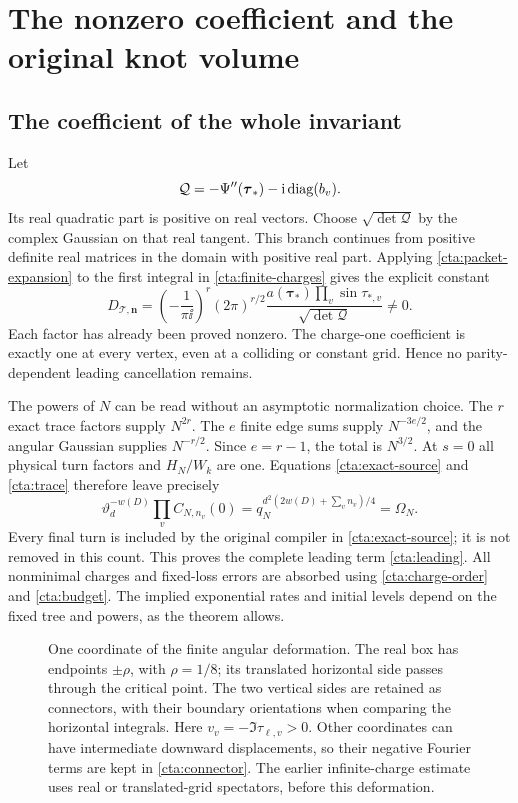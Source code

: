 \section{The nonzero coefficient and the original knot volume}
\label{cta:conclusion}

\subsection{The coefficient of the whole invariant}
Let
\[
 \mathcal Q=-\Psi''(\boldsymbol\tau_*)-\mathrm i\operatorname{diag}(b_v).
\]
Its real quadratic part is positive on real vectors.
Choose \(\sqrt{\det\mathcal Q}\) by the complex Gaussian on that
real tangent. This branch continues from positive definite real
matrices in the domain with positive real part.
Applying \eqref{cta:packet-expansion} to the first integral
in \eqref{cta:finite-charges} gives the explicit constant
\begin{equation}\label{cta:amplitude}
 D_{\mathcal T,\mathbf n}
 =\left(-\frac1{\pi\ii}\right)^r(2\pi)^{r/2}
   \frac{a(\boldsymbol\tau_*)\prod_v\sin\tau_{*,v}}
        {\sqrt{\det\mathcal Q}}\ne0 .
\end{equation}
Each factor has already been proved nonzero.
The charge-one coefficient is exactly one at every vertex,
even at a colliding or constant grid. Hence no parity-dependent
leading cancellation remains.

The powers of \(N\) can be read without an asymptotic
normalization choice. The \(r\) exact trace factors supply
\(N^{2r}\). The \(e\) finite edge sums supply \(N^{-3e/2}\),
and the angular Gaussian supplies \(N^{-r/2}\).
Since \(e=r-1\), the total is \(N^{3/2}\).
At \(s=0\) all physical turn factors and \(H_N/W_k\) are one.
Equations \eqref{cta:exact-source} and \eqref{cta:trace} therefore
leave precisely
\[
 \vartheta_d^{-w(D)}\prod_v C_{N,n_v}(0)
       =q_N^{d^2(2w(D)+\sum_vn_v)/4}=\Omega_N.
\]
Every final turn is included by the original compiler in
\eqref{cta:exact-source}; it is not removed in this count.
This proves the complete leading term \eqref{cta:leading}.
All nonminimal charges and fixed-loss errors are absorbed
using \eqref{cta:charge-order} and \eqref{cta:budget}.
The implied exponential rates and initial levels depend on
the fixed tree and powers, as the theorem allows.

\begin{figure}[ht]
\centering
\caption{One coordinate of the finite angular deformation.
The real box has endpoints \(\pm\rho\), with \(\rho=1/8\);
its translated horizontal side passes through the critical point.
The two vertical sides are retained as connectors, with their
boundary orientations when comparing the horizontal integrals.
Here \(v_v=-\Im\tau_{\boldsymbol\ell,v}>0\).
Other coordinates can have intermediate downward displacements,
so their negative Fourier terms are kept in
\eqref{cta:connector}. The earlier infinite-charge estimate
uses real or translated-grid spectators, before this deformation.}
\label{cta:contour-figure}
\end{figure}

